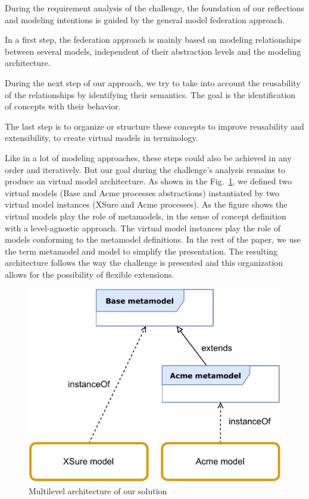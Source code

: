
During the requirement analysis of the challenge, the foundation of our reflections and modeling intentions is guided by the general model federation approach.

In a first step, the federation approach is mainly based on modeling relationships between several models, independent of their abstraction levels and the modeling architecture.

During the next step of our approach, we try to take into account the reusability of the relationships by identifying their semantics. The goal is the identification of concepts with their behavior.

The last step is to organize or structure these concepts to improve reusability and extensibility, to create virtual models in \FML terminology.

Like in a lot of modeling approaches, these  steps could also be achieved in any order and iteratively. But our goal during the challenge's analysis remains to produce an \FML virtual model architecture.
As shown in the Fig.~\ref{fig:MultilevelArchitecture}, we defined two virtual models (Base and Acme processes abstractions) instantiated by two virtual model instances (XSure and Acme processes). As the figure shows the virtual models play the role of metamodels, in the sense of concept definition with a level-agnostic approach. The virtual model instances play the role of models conforming to the metamodel definitions. In the rest of the paper, we use the term metamodel and model to simplify the presentation.
The resulting architecture follows the way the challenge is presented and this
organization allows for the possibility of flexible extensions.


\begin{figure}[t]
    \centering
    \includegraphics[width=0.9 \columnwidth]{Figures/MultilevelArchitecture-1.5.pdf}
    \caption{Multilevel architecture of our solution}
    \label{fig:MultilevelArchitecture}
\end{figure}

